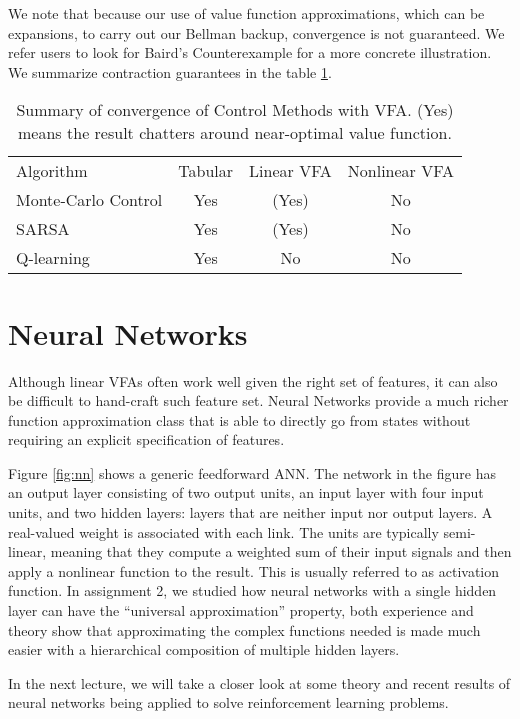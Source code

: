 \documentclass{article}
\begin{document}
We note that because our use of value function approximations, which can be expansions, to carry out our Bellman backup, convergence is not guaranteed. We refer users to look for Baird's Counterexample for a more concrete illustration. We summarize contraction guarantees in the table \ref{tab:control-summary}.

\begin{table}[]
\centering
\begin{tabular}{lccc}
Algorithm           & Tabular & Linear VFA & Nonlinear VFA \\
Monte-Carlo Control & Yes     & (Yes)      & No \\
SARSA               & Yes     & (Yes)      & No \\
Q-learning          & Yes     & No         & No \\
\end{tabular}
\caption{Summary of convergence of Control Methods with VFA. (Yes) means the result chatters around near-optimal value function.}\label{tab:control-summary}
\end{table}

\section{Neural Networks}

Although linear VFAs often work well given the right set of features, it can also be difficult to hand-craft such feature set. Neural Networks provide a much richer function approximation class that is able to directly go from states without requiring an explicit specification of features.

Figure \ref{fig:nn} shows a generic feedforward ANN. The network in the figure has an output layer consisting of two output units, an input layer with four input units, and two hidden layers: layers that are neither input nor output layers. A real-valued weight is associated with each link. The units are typically semi-linear, meaning that they compute a weighted sum of their input signals and then apply a nonlinear function to the result. This is usually referred to as activation function. In assignment 2, we studied how neural networks with a single hidden layer can have the ``universal approximation'' property, both experience and theory show that approximating the complex functions needed is made much easier with a hierarchical composition of multiple hidden layers.

In the next lecture, we will take a closer look at some theory and recent results of neural networks being applied to solve reinforcement learning problems.
\end{document}
